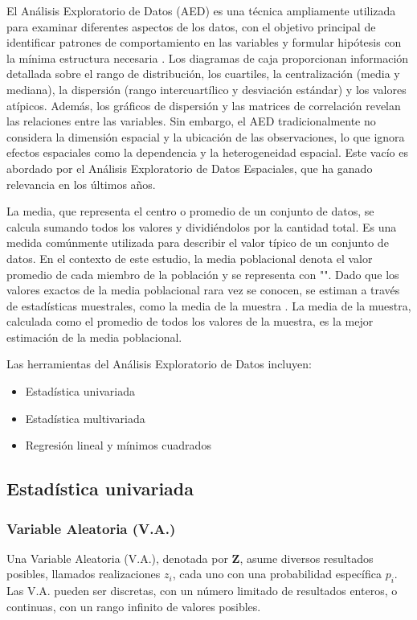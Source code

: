 El Análisis Exploratorio de Datos (AED) es una técnica ampliamente utilizada para examinar diferentes aspectos de los datos, con el objetivo principal de identificar patrones de comportamiento en las variables y formular hipótesis con la mínima estructura necesaria \cite{abe}. Los diagramas de caja proporcionan información detallada sobre el rango de distribución, los cuartiles, la centralización (media y mediana), la dispersión (rango intercuartílico y desviación estándar) y los valores atípicos. Además, los gráficos de dispersión y las matrices de correlación revelan las relaciones entre las variables. Sin embargo, el AED tradicionalmente no considera la dimensión espacial y la ubicación de las observaciones, lo que ignora efectos espaciales como la dependencia y la heterogeneidad espacial. Este vacío es abordado por el Análisis Exploratorio de Datos Espaciales, que ha ganado relevancia en los últimos años.

La media, que representa el centro o promedio de un conjunto de datos, se calcula sumando todos los valores y dividiéndolos por la cantidad total. Es una medida comúnmente utilizada para describir el valor típico de un conjunto de datos. En el contexto de este estudio, la media poblacional denota el valor promedio de cada miembro de la población y se representa con "\textmu". Dado que los valores exactos de la media poblacional rara vez se conocen, se estiman a través de estadísticas muestrales, como la media de la muestra \cite{Loftus2021}. La media de la muestra, calculada como el promedio de todos los valores de la muestra, es la mejor estimación de la media poblacional.

Las herramientas del Análisis Exploratorio de Datos incluyen:
\begin{itemize}
    \item Estadística univariada
    \item Estadística multivariada
    \item Regresión lineal y mínimos cuadrados
\end{itemize}


\subsection{Estadística univariada}

\subsubsection{Variable Aleatoria (V.A.)}
Una Variable Aleatoria (V.A.), denotada por \(\textbf{Z}\), asume diversos resultados posibles, llamados realizaciones \( z_i \), cada uno con una probabilidad específica \( p_i \). Las V.A. pueden ser discretas, con un número limitado de resultados enteros, o continuas, con un rango infinito de valores posibles.

